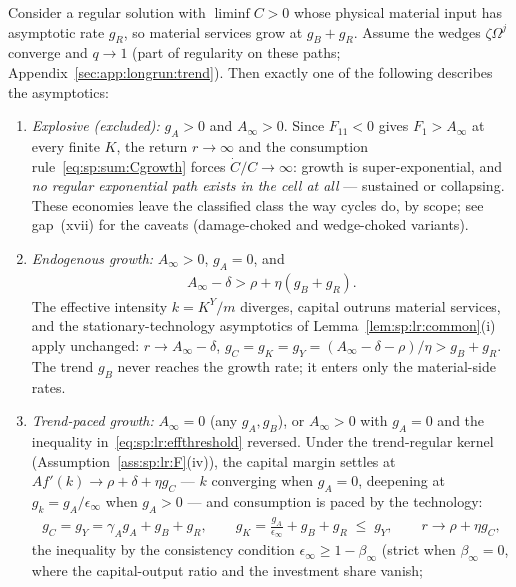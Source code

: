 \begin{lemma}\label{lem:sp:lr:branches}
Consider a regular solution with $\liminf C>0$ whose physical material input has asymptotic
rate $g_R$, so material services grow at $g_B+g_R$. Assume the wedges $\zeta\Omega^j$
converge and $q\to1$ (part of regularity on these paths;
Appendix~\ref{sec:app:longrun:trend}). Then exactly one of the following describes the
asymptotics:
\begin{enumerate}
    \item \emph{Explosive (excluded):} $g_A>0$ and $A_\infty>0$. Since $F_{11}<0$ gives
    $F_1>A_\infty$ at every finite $K$, the return $r\to\infty$ and the consumption
    rule~\eqref{eq:sp:sum:Cgrowth} forces $\dot C/C\to\infty$: growth is
    super-exponential, and \emph{no regular exponential path exists in the cell at all} ---
    sustained or collapsing. These economies leave the classified class the way cycles do,
    by scope; see gap~(xvii) for the caveats (damage-choked and wedge-choked variants).
    \item \emph{Endogenous growth:} $A_\infty>0$, $g_A=0$, and
    \begin{align}
    A_\infty-\delta>\rho+\eta\left(g_B+g_R\right).
    \label{eq:sp:lr:effthreshold}
    \end{align}
    The effective intensity $k=K^Y/m$ diverges, capital outruns material services, and the
    stationary-technology asymptotics of Lemma~\ref{lem:sp:lr:common}(i) apply unchanged:
    $r\to A_\infty-\delta$, $g_C=g_K=g_Y=\left(A_\infty-\delta-\rho\right)/\eta>g_B+g_R$.
    The trend $g_B$ never reaches the growth rate; it enters only the material-side rates.
    \item \emph{Trend-paced growth:} $A_\infty=0$ (any $g_A,g_B$), or $A_\infty>0$ with
    $g_A=0$ and the inequality in~\eqref{eq:sp:lr:effthreshold} reversed. Under the
    trend-regular kernel (Assumption~\ref{ass:sp:lr:F}(iv)), the capital margin settles at
    $Af'\left(k\right)\to\rho+\delta+\eta g_C$ --- $k$ converging when $g_A=0$, deepening at
    $g_k=g_A/\epsilon_\infty$ when $g_A>0$ --- and consumption is paced by the technology:
    \begin{align}
    g_C=g_Y=\gamma_Ag_A+g_B+g_R,
    \qquad
    g_K=\frac{g_A}{\epsilon_\infty}+g_B+g_R\;\le\;g_Y,
    \qquad
    r\to\rho+\eta g_C,
    \label{eq:sp:lr:pace}
    \end{align}
    the inequality by the consistency condition $\epsilon_\infty\ge1-\beta_\infty$ (strict
    when $\beta_\infty=0$, where the capital-output ratio and the investment share vanish;

\end{enumerate}
\end{lemma}
